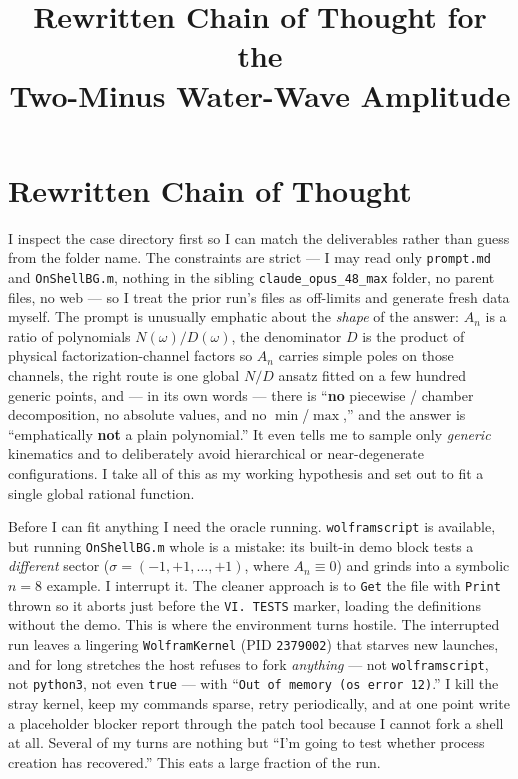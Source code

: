 \documentclass{article}
\title{Rewritten Chain of Thought for the\\
Two-Minus Water-Wave Amplitude}
\author{}
\date{}
\begin{document}
\maketitle


\section*{Rewritten Chain of Thought}

I inspect the case directory first so I can match the deliverables rather than
guess from the folder name. The constraints are strict --- I may read only
\texttt{prompt.md} and \texttt{OnShellBG.m}, nothing in the sibling
\texttt{claude\_opus\_48\_max} folder, no parent files, no web --- so I treat
the prior run's files as off-limits and generate fresh data myself. The prompt
is unusually emphatic about the \emph{shape} of the answer: $A_n$ is a
ratio of polynomials $N(\omega)/D(\omega)$, the denominator $D$ is the product
of physical factorization-channel factors so $A_n$ carries simple poles on
those channels, the right route is one global $N/D$ ansatz fitted on a few
hundred generic points, and --- in its own words --- there is ``\textbf{no}
piecewise / chamber decomposition, no absolute values, and no $\min$/$\max$,''
and the answer is ``emphatically \textbf{not} a plain polynomial.'' It even
tells me to sample only \emph{generic} kinematics and to deliberately avoid
hierarchical or near-degenerate configurations. I take all of this as my
working hypothesis and set out to fit a single global rational function.

Before I can fit anything I need the oracle running. \texttt{wolframscript} is
available, but running \texttt{OnShellBG.m} whole is a mistake: its built-in
demo block tests a \emph{different} sector ($\sigma=(-1,+1,\dots,+1)$, where
$A_n\equiv0$) and grinds into a symbolic $n=8$ example. I interrupt it. The
cleaner approach is to \texttt{Get} the file with \texttt{Print} thrown so it
aborts just before the \texttt{VI.\ TESTS} marker, loading the definitions
without the demo. This is where the environment turns hostile. The interrupted
run leaves a lingering \texttt{WolframKernel} (PID \texttt{2379002}) that
starves new launches, and for long stretches the host refuses to fork
\emph{anything} --- not \texttt{wolframscript}, not \texttt{python3}, not even
\texttt{true} --- with ``\texttt{Out of memory (os error 12)}.'' I kill the
stray kernel, keep my commands sparse, retry periodically, and at one point
write a placeholder blocker report through the patch tool because I cannot
fork a shell at all. Several of my turns are nothing but ``I'm going to test
whether process creation has recovered.'' This eats a large fraction of the
run.
\end{document}
